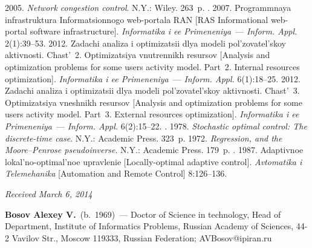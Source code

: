 \begin{multicols}{2}
{{\begin{thebibliography}{99}
 2005. \textit{Network congestion control}. N.Y.: Wiley. 263~p.
. 2007. Programmnaya infrastruktura
Informatsionnogo web-portala RAN [RAS Informational web-portal software
infrastructure]. \textit{Informatika i ee Primeneniya}~--- \textit{Inform. Appl.}
2(1):39--53.
 2012. Zadachi analiza i optimizatsii dlya mo\-de\-li
pol'zovatel'skoy aktivnosti. Chast'~2. Optimizatsiya vnutrennikh resursov [Analysis
and optimization problems for some users activity model. Part~2. Internal resources
optimization]. \textit{Informatika i ee Primeneniya}~--- \textit{Inform. Appl.}
6(1):18--25.
 2012. Zadachi analiza i optimizatsii dlya modeli
pol'zovatel'skoy aktivnosti. Chast'~3. Optimizatsiya vneshnikh resursov [Analysis and
optimization problems for some users activity model. Part~3. External resources
optimization]. \textit{Informatika i ee Primeneniya}~--- \textit{Inform. Appl.}
6(2):15--22.
. 1978. \textit{Stochastic optimal control:
The discrete-time case}. N.Y.: Academic Press. 323~p.
 1972. \textit{Regression, and the Moore--Penrose pseudoinverse}.
N.Y.: Academic Press. 179~p.
. 1987. Adaptivnoe
lokal'no-optimal'noe upravlenie [Locally-optimal adaptive control].
\textit{Avtomatika i Telemehanika} [Automation and Remote Control]
8:126--136.

\end{thebibliography}

 }
 }

\end{multicols}

\vspace*{-6pt}

\hfill{\small\textit{Received March 6, 2014}}

\vspace*{-18pt}

\Contrl

\noindent
\textbf{Bosov Alexey V.}~(b.~1969)~--- Doctor of Science in technology,
Head of Department, Institute of Informatics Problems, Russian Academy of
Sciences, 44-2 Vavilov Str., Moscow 119333, Russian Federation;
AVBosov@ipiran.ru

\label{end\stat}

\renewcommand{\bibname}{\protect\rm Литература}